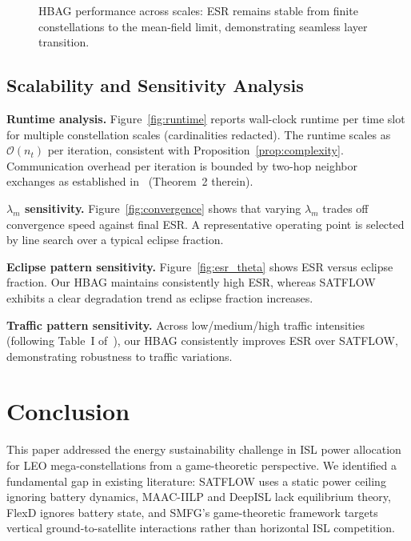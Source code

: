 \documentclass[journal]{IEEEtran}
\begin{document}
\begin{figure}[t]
\centering
\caption{HBAG performance across scales: ESR remains stable from finite constellations to the mean-field limit, demonstrating seamless layer transition.}
\label{fig:layer_transition}
\end{figure}

\subsection{Scalability and Sensitivity Analysis}

\textbf{Runtime analysis.}
Figure~\ref{fig:runtime} reports wall-clock runtime per time slot for multiple constellation scales (cardinalities redacted). The runtime scales as $\mathcal{O}(n_t)$ per iteration, consistent with Proposition~\ref{prop:complexity}. Communication overhead per iteration is bounded by two-hop neighbor exchanges as established in~\cite{cen2024satflow} (Theorem~2 therein).

\textbf{$\lambda_m$ sensitivity.}
Figure~\ref{fig:convergence} shows that varying $\lambda_m$ trades off convergence speed against final ESR. A representative operating point is selected by line search over a typical eclipse fraction.

\textbf{Eclipse pattern sensitivity.}
Figure~\ref{fig:esr_theta} shows ESR versus eclipse fraction. Our HBAG maintains consistently high ESR, whereas SATFLOW exhibits a clear degradation trend as eclipse fraction increases.

\textbf{Traffic pattern sensitivity.}
Across low/medium/high traffic intensities (following Table~I of~\cite{cen2024satflow}), our HBAG consistently improves ESR over SATFLOW, demonstrating robustness to traffic variations.

\section{Conclusion}
\label{sec:conclusion}

This paper addressed the energy sustainability challenge in ISL power allocation for LEO mega-constellations from a game-theoretic perspective. We identified a fundamental gap in existing literature: SATFLOW uses a static power ceiling ignoring battery dynamics, MAAC-IILP and DeepISL lack equilibrium theory, FlexD ignores battery state, and SMFG's game-theoretic framework targets vertical ground-to-satellite interactions rather than horizontal ISL competition.
\end{document}

